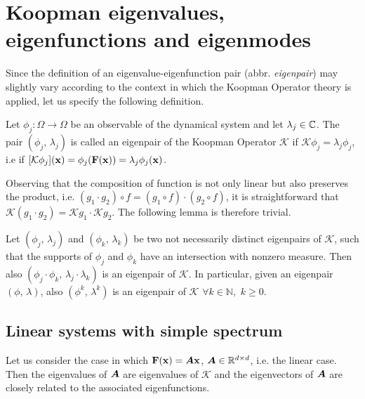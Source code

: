 \section{Koopman eigenvalues, eigenfunctions and eigenmodes}

Since the definition of an eigenvalue-eigenfunction pair (abbr. \emph{eigenpair}) may slightly vary according to the context in which the Koopman Operator theory is applied, let us specify the following definition.
\begin{definition}
Let $\phi_j:\Omega\to\Omega$ be an observable of the dynamical system and let $\lambda_j\in\mathbb{C}$. The pair $(\phi_j, \,\lambda_j)$ is called an eigenpair of the Koopman Operator $\mathcal{K}$ if $\mathcal{K}\phi_j = \lambda_j\phi_j$, i.e if $[\mathcal{K}\phi_j](\vb{x}) = \phi_j(\vb{F}(\vb{x})) = \lambda_j\phi_j(\vb{x})$.
\end{definition}

Observing that the composition of function is not only linear but also preserves the product, i.e. $(g_1 \cdot g_2) \circ f = (g_1 \circ f) \cdot (g_2 \circ f)$, it is straightforward that $\mathcal{K}(g_1\cdot g_2) = \mathcal{K}g_1\cdot \mathcal{K}g_2$. The following lemma is therefore trivial.
\begin{lemma}
\label{eigenpair_multiplication}
Let $(\phi_j, \,\lambda_j)$ and $(\phi_k, \,\lambda_k)$ be two not necessarily distinct eigenpairs of $\mathcal{K}$, such that the supports of $\phi_j$ and $\phi_k$ have an intersection with nonzero measure. Then also $(\phi_j\cdot\phi_k, \,\lambda_j\cdot\lambda_k)$ is an eigenpair of $\mathcal{K}$. In particular, given an eigenpair $(\phi, \,\lambda)$, also $(\phi^k, \,\lambda^k)$ is an eigenpair of $\mathcal{K}$ $\forall k\in\mathbb{N},\,\, k \geq 0$.
\end{lemma}

\subsection{Linear systems with simple spectrum}
Let us consider the case in which $\vb{F}(\vb{x}) = \vb*{A}\vb{x}$, $\vb*{A}\in\mathbb{R}^{d\times d}$, i.e. the linear case. Then the eigenvalues of $\vb*{A}$ are eigenvalues of $\mathcal{K}$ and the eigenvectors of $\vb*{A}$ are closely related to the associated eigenfunctions.

